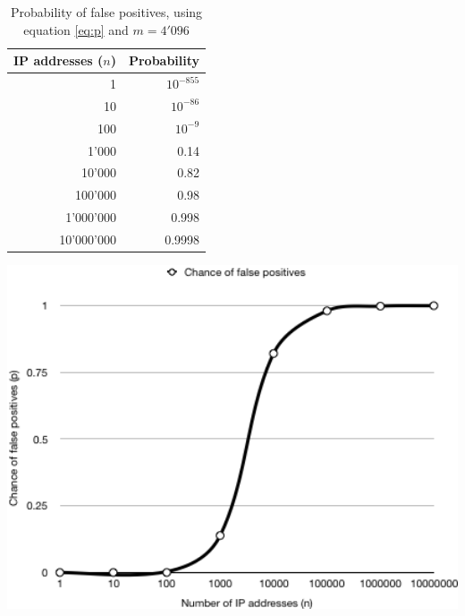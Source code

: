 \begin{table}[ht]
\begin{minipage}[b]{.45\textwidth}
        \begin{tabular}{r | r}
            \hline
            IP addresses ($n$) & Probability \\ \hline
            1 & $10^{-855}$ \\ \hline
            10 & $10^{-86}$ \\ \hline
            100 & $10^{-9}$ \\ \hline
            1'000 & 0.14 \\ \hline
            10'000 & 0.82 \\ \hline
            100'000 & 0.98 \\ \hline
            1'000'000 & 0.998 \\ \hline
            10'000'000 & 0.9998 \\ \hline
        \end{tabular}
            \caption{Probability of false positives, using equation \ref{eq:p} and $m = 4'096$}
            \label{table:Probability}
\end{minipage}
\hspace{.1\textwidth}
\begin{minipage}[b]{.45\textwidth}
        \includegraphics[width=1\textwidth]{v3-chance.png}
        \label{fig:Probability}
\end{minipage}
\end{table}

